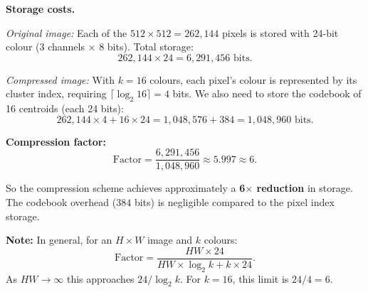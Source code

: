 \begin{answer}
\textbf{Storage costs.}

\emph{Original image:} Each of the $512 \times 512 = 262{,}144$ pixels is stored with 24-bit colour (3 channels × 8 bits). Total storage:
$$262{,}144 \times 24 = 6{,}291{,}456 \text{ bits.}$$

\emph{Compressed image:} With $k = 16$ colours, each pixel's colour is represented by its cluster index, requiring $\lceil\log_2 16\rceil = 4$ bits. We also need to store the codebook of 16 centroids (each 24 bits):
$$262{,}144 \times 4 + 16 \times 24 = 1{,}048{,}576 + 384 = 1{,}048{,}960 \text{ bits.}$$

\textbf{Compression factor:}
$$\text{Factor} = \frac{6{,}291{,}456}{1{,}048{,}960} \approx 5.997 \approx 6.$$

So the compression scheme achieves approximately a \textbf{6$\times$ reduction} in storage. The codebook overhead ($384$ bits) is negligible compared to the pixel index storage.

\textbf{Note:} In general, for an $H \times W$ image and $k$ colours:
$$\text{Factor} = \frac{HW \times 24}{HW \times \log_2 k + k \times 24}.$$
As $HW \to \infty$ this approaches $24 / \log_2 k$. For $k=16$, this limit is $24/4 = 6$.
\end{answer}
